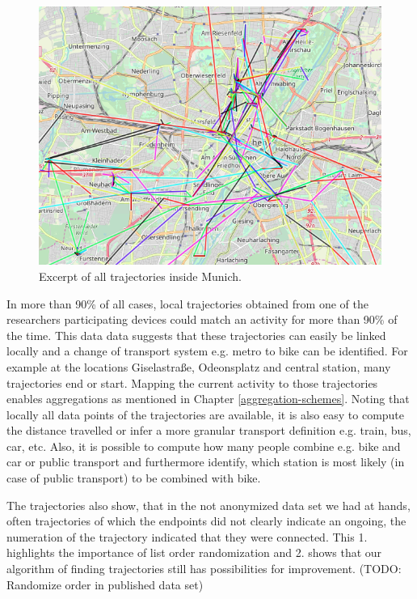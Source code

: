 \begin{figure}[h!]
	\includegraphics[width=\textwidth]{data/trajectories-3.png}
	\caption{Excerpt of all trajectories inside Munich.}
	\label{trajectories2}
\end{figure}

In more than 90\% of all cases, local trajectories obtained from one of the researchers participating devices could match an activity for more than 90\% of the time. This data data suggests that these trajectories can easily be linked locally and a change of transport system e.g. metro to bike can be identified. For example at the locations Giselastraße, Odeonsplatz and central station, many trajectories end or start. Mapping the current activity to those trajectories enables aggregations as mentioned in Chapter \ref{aggregation-schemes}. Noting that locally all data points of the trajectories are available, it is also easy to compute the distance travelled or infer a more granular transport definition e.g. train, bus, car, etc. Also, it is possible to compute how many people combine e.g. bike and car or public transport and furthermore identify, which station is most likely (in case of public transport) to be combined with bike.

The trajectories also show, that in the not anonymized data set we had at hands, often trajectories of which the endpoints did not clearly indicate an ongoing, the numeration of the trajectory indicated that they were connected. This 1. highlights the importance of list order randomization and 2. shows that our algorithm of finding trajectories still has possibilities for improvement. (TODO: Randomize order in published data set)


